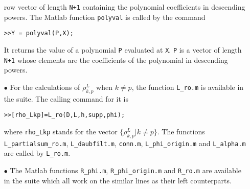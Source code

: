 \documentclass[acmtoms]{acmtrans2m}
\begin{document}
\begin{itemize}
row vector of length \verb#N+1# containing the polynomial coefficients in
descending powers. The Matlab function \verb#polyval# is called by the command
\begin{verbatim}
>>Y = polyval(P,X);
\end{verbatim}
It returns the value of a polynomial
\verb#P# evaluated at \verb#X#. \verb#P#
is a vector of length \verb#N+1# whose elements are the coefficients of the polynomial in descending powers.
\item[$\bullet$] For the calculations of $\rho_{k,p}^L$ when $k \neq p$, the function \verb#L_ro.m# is available in the suite. The calling command for it is
\begin{alltt}
>>[rho_Lkp]=L_ro(D,L,h,supp,phi);
\end{alltt}
where \verb#rho_Lkp# stands for the vector $\{\rho_{k,p}^L | k \neq p\}$. The functions \verb#L_partialsum_ro.m#, \verb#L_daubfilt.m#, \verb#conn.m#,
\verb#L_phi_origin.m# and \verb#L_alpha.m# are called by  \verb#L_ro.m#.
\item[$\bullet$] The Matlab functions
\verb#R_phi.m#, \verb#R_phi_origin.m# and \verb#R_ro.m# are available in the suite which all work
on the similar lines as their left counterparts.
\end{itemize}
\end{document}
